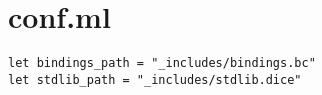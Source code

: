 \section{conf.ml}
\begin{verbatim}
let bindings_path = "_includes/bindings.bc"
let stdlib_path = "_includes/stdlib.dice"
\end{verbatim}	